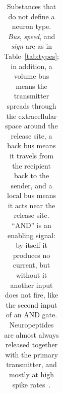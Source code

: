 \begin{table}[t]
\begin{tabular}{>{\raggedright}p{2.25cm}>{\raggedright}p{2.8cm}>{\raggedright}p{1.8cm}>{\raggedright}p{1.5cm}>{\centering}p{0.8cm}>{\raggedright\arraybackslash}p{4.3cm}}
\bottomrule
\end{tabular}
\caption{Substances that do not define a neuron type. \emph{Bus}, \emph{speed}, and \emph{sign} are as in Table~\ref{tab:types}; in addition, a volume bus means the transmitter spreads through the extracellular space around the release site, a back bus means it travels from the recipient back to the sender, and a local bus means it acts near the release site. ``AND'' is an enabling signal: by itself it produces no current, but without it another input does not fire, like the second input of an AND gate. Neuropeptides are almost always released together with the primary transmitter, and mostly at high spike rates~\cite{vandenPol2012}.}
\label{tab:othermediators}
\end{table}
